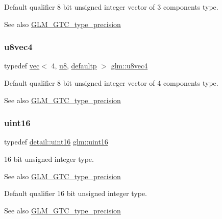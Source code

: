 Default qualifier 8 bit unsigned integer vector of 3 components type. \begin{DoxySeeAlso}{See also}
\hyperlink{group__gtc__type__precision}{G\+L\+M\+\_\+\+G\+T\+C\+\_\+type\+\_\+precision} 
\end{DoxySeeAlso}
\mbox{\label{group__gtc__type__precision_ga6c8841fa492bd5b1078b171452fd6974}} 
\subsubsection{\texorpdfstring{u8vec4}{u8vec4}}
{\footnotesize\ttfamily typedef \hyperlink{structglm_1_1vec}{vec}$<$ 4, \hyperlink{group__gtc__type__precision_ga5e3dc67373d5068997d2d9f41c9024d2}{u8}, \hyperlink{namespaceglm_a36ed105b07c7746804d7fdc7cc90ff25a9d21ccd8b5a009ec7eb7677befc3bf51}{defaultp} $>$ \hyperlink{group__gtc__type__precision_ga6c8841fa492bd5b1078b171452fd6974}{glm\+::u8vec4}}

Default qualifier 8 bit unsigned integer vector of 4 components type. \begin{DoxySeeAlso}{See also}
\hyperlink{group__gtc__type__precision}{G\+L\+M\+\_\+\+G\+T\+C\+\_\+type\+\_\+precision} 
\end{DoxySeeAlso}
\mbox{\label{group__gtc__type__precision_gad8c2939e1fdd8e5828b31d95c52255d5}} 
\subsubsection{\texorpdfstring{uint16}{uint16}}
{\footnotesize\ttfamily typedef \hyperlink{namespaceglm_1_1detail_a47b2a7d006d187338e8031a352d1ce56}{detail\+::uint16} \hyperlink{group__gtc__type__precision_gad8c2939e1fdd8e5828b31d95c52255d5}{glm\+::uint16}}

16 bit unsigned integer type. \begin{DoxySeeAlso}{See also}
\hyperlink{group__gtc__type__precision}{G\+L\+M\+\_\+\+G\+T\+C\+\_\+type\+\_\+precision}
\end{DoxySeeAlso}
Default qualifier 16 bit unsigned integer type. \begin{DoxySeeAlso}{See also}
\hyperlink{group__gtc__type__precision}{G\+L\+M\+\_\+\+G\+T\+C\+\_\+type\+\_\+precision} 
\end{DoxySeeAlso}
\mbox{\label{group__gtc__type__precision_gac4eb4f43cae8129b00086dc234d3b8fc}} 
